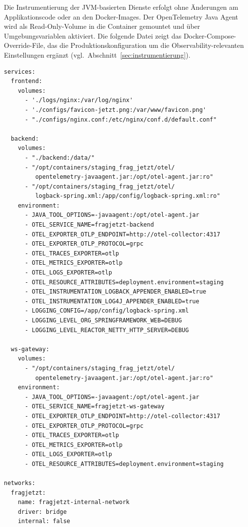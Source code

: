 Die Instrumentierung der JVM-basierten Dienste erfolgt ohne Änderungen am Applikationscode oder an den Docker-Images. Der OpenTelemetry Java Agent wird als Read-Only-Volume in die Container gemountet und über Umgebungsvariablen aktiviert. Die folgende Datei zeigt das Docker-Compose-Override-File, das die Produktionskonfiguration um die Observability-relevanten Einstellungen ergänzt (vgl.\ Abschnitt~\ref{sec:instrumentierung}).

\begin{lstlisting}[style=yamlstyle, caption={Docker Compose Override (\texttt{docker-compose.override.yml}).}, label={lst:compose-override}]
services:
  frontend:
    volumes:
      - './logs/nginx:/var/log/nginx'
      - './configs/favicon-jetzt.png:/var/www/favicon.png'
      - "./configs/nginx.conf:/etc/nginx/conf.d/default.conf"

  backend:
    volumes:
      - "./backend:/data/"
      - "/opt/containers/staging_frag_jetzt/otel/
         opentelemetry-javaagent.jar:/opt/otel-agent.jar:ro"
      - "/opt/containers/staging_frag_jetzt/otel/
         logback-spring.xml:/app/config/logback-spring.xml:ro"
    environment:
      - JAVA_TOOL_OPTIONS=-javaagent:/opt/otel-agent.jar
      - OTEL_SERVICE_NAME=fragjetzt-backend
      - OTEL_EXPORTER_OTLP_ENDPOINT=http://otel-collector:4317
      - OTEL_EXPORTER_OTLP_PROTOCOL=grpc
      - OTEL_TRACES_EXPORTER=otlp
      - OTEL_METRICS_EXPORTER=otlp
      - OTEL_LOGS_EXPORTER=otlp
      - OTEL_RESOURCE_ATTRIBUTES=deployment.environment=staging
      - OTEL_INSTRUMENTATION_LOGBACK_APPENDER_ENABLED=true
      - OTEL_INSTRUMENTATION_LOG4J_APPENDER_ENABLED=true
      - LOGGING_CONFIG=/app/config/logback-spring.xml
      - LOGGING_LEVEL_ORG_SPRINGFRAMEWORK_WEB=DEBUG
      - LOGGING_LEVEL_REACTOR_NETTY_HTTP_SERVER=DEBUG

  ws-gateway:
    volumes:
      - "/opt/containers/staging_frag_jetzt/otel/
         opentelemetry-javaagent.jar:/opt/otel-agent.jar:ro"
    environment:
      - JAVA_TOOL_OPTIONS=-javaagent:/opt/otel-agent.jar
      - OTEL_SERVICE_NAME=fragjetzt-ws-gateway
      - OTEL_EXPORTER_OTLP_ENDPOINT=http://otel-collector:4317
      - OTEL_EXPORTER_OTLP_PROTOCOL=grpc
      - OTEL_TRACES_EXPORTER=otlp
      - OTEL_METRICS_EXPORTER=otlp
      - OTEL_LOGS_EXPORTER=otlp
      - OTEL_RESOURCE_ATTRIBUTES=deployment.environment=staging

networks:
  fragjetzt:
    name: fragjetzt-internal-network
    driver: bridge
    internal: false
\end{lstlisting}


